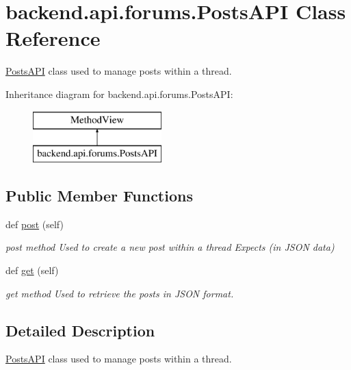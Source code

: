 \hypertarget{classbackend_1_1api_1_1forums_1_1_posts_a_p_i}{}\section{backend.\+api.\+forums.\+Posts\+A\+P\+I Class Reference}
\label{classbackend_1_1api_1_1forums_1_1_posts_a_p_i}


\hyperlink{classbackend_1_1api_1_1forums_1_1_posts_a_p_i}{Posts\+A\+P\+I} class used to manage posts within a thread.  


Inheritance diagram for backend.\+api.\+forums.\+Posts\+A\+P\+I\+:\begin{figure}[H]
\begin{center}
\leavevmode
\includegraphics[height=2.000000cm]{classbackend_1_1api_1_1forums_1_1_posts_a_p_i}
\end{center}
\end{figure}
\subsection*{Public Member Functions}
\begin{DoxyCompactItemize}
\item 
def \hyperlink{classbackend_1_1api_1_1forums_1_1_posts_a_p_i_a1016588def16670a3b312d577f735f78}{post} (self)
\begin{DoxyCompactList}\small\item\em post method Used to create a new post within a thread Expects (in J\+S\+O\+N data) \end{DoxyCompactList}\item 
def \hyperlink{classbackend_1_1api_1_1forums_1_1_posts_a_p_i_a3c9cf0e6e45ece752053e40d9ccda7b7}{get} (self)
\begin{DoxyCompactList}\small\item\em get method Used to retrieve the posts in J\+S\+O\+N format. \end{DoxyCompactList}\end{DoxyCompactItemize}


\subsection{Detailed Description}
\hyperlink{classbackend_1_1api_1_1forums_1_1_posts_a_p_i}{Posts\+A\+P\+I} class used to manage posts within a thread. 

